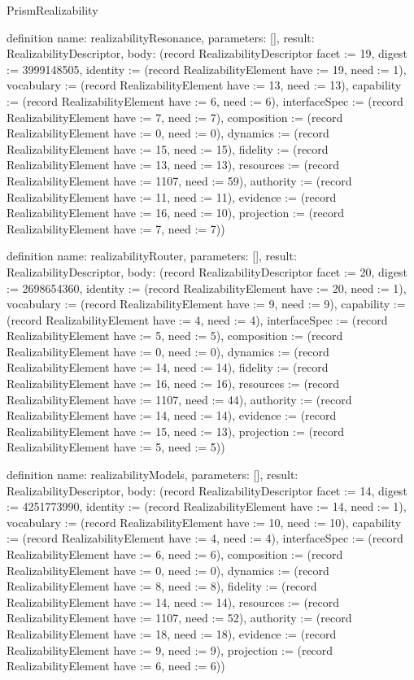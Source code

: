 \begin{lexlean}{PrismRealizability}
\begin{semanticmodule}
definition{
  name: realizabilityResonance,
  parameters: [],
  result: RealizabilityDescriptor,
  body: (record RealizabilityDescriptor {facet := 19, digest := 3999148505, identity := (record RealizabilityElement {have := 19, need := 1}), vocabulary := (record RealizabilityElement {have := 13, need := 13}), capability := (record RealizabilityElement {have := 6, need := 6}), interfaceSpec := (record RealizabilityElement {have := 7, need := 7}), composition := (record RealizabilityElement {have := 0, need := 0}), dynamics := (record RealizabilityElement {have := 15, need := 15}), fidelity := (record RealizabilityElement {have := 13, need := 13}), resources := (record RealizabilityElement {have := 1107, need := 59}), authority := (record RealizabilityElement {have := 11, need := 11}), evidence := (record RealizabilityElement {have := 16, need := 10}), projection := (record RealizabilityElement {have := 7, need := 7})})
}

definition{
  name: realizabilityRouter,
  parameters: [],
  result: RealizabilityDescriptor,
  body: (record RealizabilityDescriptor {facet := 20, digest := 2698654360, identity := (record RealizabilityElement {have := 20, need := 1}), vocabulary := (record RealizabilityElement {have := 9, need := 9}), capability := (record RealizabilityElement {have := 4, need := 4}), interfaceSpec := (record RealizabilityElement {have := 5, need := 5}), composition := (record RealizabilityElement {have := 0, need := 0}), dynamics := (record RealizabilityElement {have := 14, need := 14}), fidelity := (record RealizabilityElement {have := 16, need := 16}), resources := (record RealizabilityElement {have := 1107, need := 44}), authority := (record RealizabilityElement {have := 14, need := 14}), evidence := (record RealizabilityElement {have := 15, need := 13}), projection := (record RealizabilityElement {have := 5, need := 5})})
}

definition{
  name: realizabilityModels,
  parameters: [],
  result: RealizabilityDescriptor,
  body: (record RealizabilityDescriptor {facet := 14, digest := 4251773990, identity := (record RealizabilityElement {have := 14, need := 1}), vocabulary := (record RealizabilityElement {have := 10, need := 10}), capability := (record RealizabilityElement {have := 4, need := 4}), interfaceSpec := (record RealizabilityElement {have := 6, need := 6}), composition := (record RealizabilityElement {have := 0, need := 0}), dynamics := (record RealizabilityElement {have := 8, need := 8}), fidelity := (record RealizabilityElement {have := 14, need := 14}), resources := (record RealizabilityElement {have := 1107, need := 52}), authority := (record RealizabilityElement {have := 18, need := 18}), evidence := (record RealizabilityElement {have := 9, need := 9}), projection := (record RealizabilityElement {have := 6, need := 6})})
}


\end{semanticmodule}
\end{lexlean}
